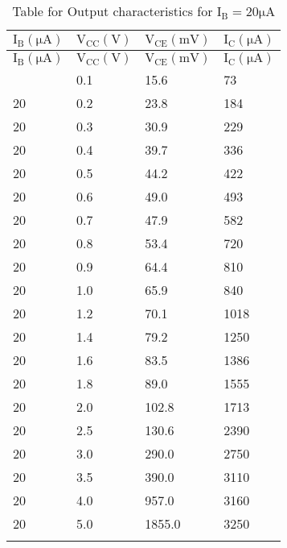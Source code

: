 \documentclass[12pt]{article}
\begin{document}
\begin{longtable}{|l|l|l|l|}
	\hline
    $\mathrm{I_{B}(\mu A)}$ & $\mathrm{V_{CC}(V)}$ & $\mathrm{V_{CE}(mV)}$&  $\mathrm{I_{C}(\mu A)}$ \\ \hline
	\endfirsthead
	\hline
    $\mathrm{I_{B}(\mu A)}$ & $\mathrm{V_{CC}(V)}$& $\mathrm{V_{CE}(mV)}$&  $\mathrm{I_{C}(\mu A)}$ \\ \hline
	\endhead
	\hline
	\endfoot
	\endlastfoot
    20  & 0.1  & 15.6  & 73   \\ \hline
    20  & 0.2  & 23.8  & 184  \\ \hline
    20  & 0.3  & 30.9  & 229  \\ \hline
    20  & 0.4  & 39.7  & 336  \\ \hline
    20  & 0.5  & 44.2  & 422  \\ \hline
    20  & 0.6  & 49.0  & 493  \\ \hline
    20  & 0.7  & 47.9  & 582  \\ \hline
    20  & 0.8  & 53.4  & 720  \\ \hline
    20  & 0.9  & 64.4  & 810  \\ \hline
    20  & 1.0  & 65.9  & 840  \\ \hline
    20  & 1.2  & 70.1  & 1018 \\ \hline
    20  & 1.4  & 79.2  & 1250 \\ \hline
    20  & 1.6  & 83.5  & 1386 \\ \hline
    20  & 1.8  & 89.0  & 1555 \\ \hline
    20  & 2.0  & 102.8 & 1713 \\ \hline
    20  & 2.5  & 130.6 & 2390 \\ \hline
    20  & 3.0  & 290.0 & 2750 \\ \hline
    20  & 3.5  & 390.0 & 3110 \\ \hline
    20  & 4.0  & 957.0 & 3160 \\ \hline
    20  & 5.0  & 1855.0 & 3250 \\ \hline
\caption{Table for Output characteristics for $\mathrm{I_B=20 \mu A}$}
\label{tab:part02_02}
\end{longtable}
\end{document}
